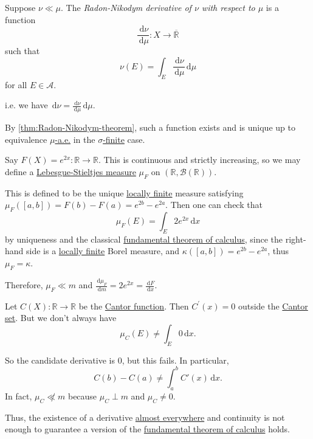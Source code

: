 \begin{definition}\label{def:Radon-Nikodym-derivative}
	Suppose \(\nu \ll \mu\). The \emph{Radon-Nikodym derivative of \(\nu\) with respect to \(\mu\)} is a function
	\[
		\frac{\,\mathrm{d} \nu}{\,\mathrm{d} \mu} \colon X \to \overline{\mathbb{R}}
	\]
	such that
	\[
		\nu(E) = \int_E \frac{\,\mathrm{d} \nu}{\,\mathrm{d} \mu} \,\mathrm{d} \mu
	\]
	for all \(E \in \mathcal{A}\).
\end{definition}
\begin{remark}
	i.e. we have \(\,\mathrm{d} \nu = \frac{\,\mathrm{d} \nu}{\,\mathrm{d} \mu} \,\mathrm{d} \mu\).
\end{remark}
\begin{note}
	By \autoref{thm:Radon-Nikodym-theorem}, such a function exists and is unique up to equivalence \hyperref[def:mu-almost-everywhere]{\(\mu\)-a.e.}
	in the \hyperref[def:finite-signed-measure]{\(\sigma\)-finite} case.
\end{note}
\begin{eg}
	Say \(F(X) = e^{2x} \colon \mathbb{R} \to \mathbb{R}\). This is continuous and strictly increasing, so we may define a \hyperref[def:Lebesgue-Stieltjes-measure]{Lebesgue-Stieltjes measure}
	\(\mu_F\) on \((\mathbb{R}, \mathcal{B}(\mathbb{R}))\).

	This is defined to be the unique \hyperref[def:locally-finite]{locally finite} measure satisfying \(\mu_F([a,b]) = F(b) - F(a) = e^{2b} - e^{2a}\). Then one can check that
	\[
		\mu_F(E) = \int_E 2e^{2x} \,\mathrm{d} x
	\]
	by uniqueness and the classical \underline{fundamental theorem of calculus}, since the right-hand side is a \hyperref[def:locally-finite]{locally finite} Borel measure, and
	\(\kappa([a,b]) = e^{2b} - e^{2a}\), thus \(\mu_F = \kappa\).

	Therefore, \(\mu_F \ll m\) and \(\frac{\,\mathrm{d} \mu_F}{\,\mathrm{d} m} = 2e^{2x} = \frac{\,\mathrm{d} F}{\,\mathrm{d} x}\).
\end{eg}

\begin{eg}
	Let \(C(X) \colon \mathbb{R} \to \mathbb{R}\) be the \hyperref[sssec:Cantor-Function]{Cantor function}. Then \(C^\prime(x) = 0\) outside the \hyperref[eg:lec8:Cantor-set]{Cantor set}.
	But we don't always have
	\[
		\mu_C(E) \neq \int_E 0 \,\mathrm{d} x.
	\]

	So the candidate derivative is \(0\), but this fails. In particular,
	\[
		C(b) - C(a) \neq \int_a^b C'(x) \,\mathrm{d} x.
	\]
	In fact, \(\mu_C \not\ll m\) because \(\mu_C \perp m\) and \(\mu_C \neq 0\).

	Thus, the existence of a derivative \hyperref[def:mu-almost-everywhere]{almost everywhere} and continuity is not enough to guarantee a version of the \underline{fundamental theorem of calculus} holds.
\end{eg}